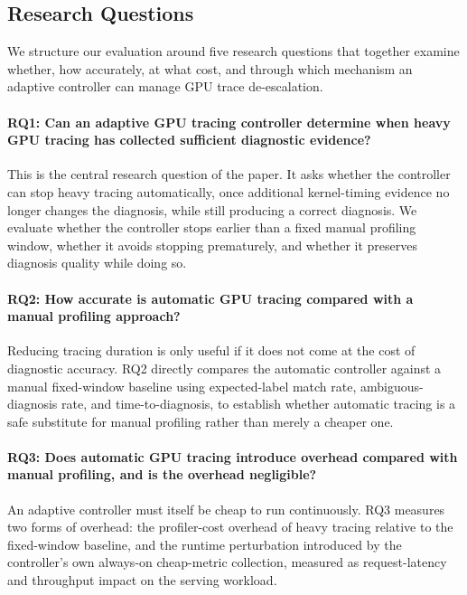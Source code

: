 \subsection{Research Questions}

We structure our evaluation around five research questions that together examine whether,
how accurately, at what cost, and through which mechanism an adaptive controller can manage
GPU trace de-escalation.

\paragraph{RQ1: Can an adaptive GPU tracing controller determine when heavy GPU tracing has
collected sufficient diagnostic evidence?}
This is the central research question of the paper. It asks whether the controller can stop
heavy tracing automatically, once additional kernel-timing evidence no longer changes the
diagnosis, while still producing a correct diagnosis. We evaluate whether the controller
stops earlier than a fixed manual profiling window, whether it avoids stopping prematurely,
and whether it preserves diagnosis quality while doing so.

\paragraph{RQ2: How accurate is automatic GPU tracing compared with a manual profiling
approach?}
Reducing tracing duration is only useful if it does not come at the cost of diagnostic
accuracy. RQ2 directly compares the automatic controller against a manual fixed-window
baseline using expected-label match rate, ambiguous-diagnosis rate, and time-to-diagnosis,
to establish whether automatic tracing is a safe substitute for manual profiling rather than
merely a cheaper one.

\paragraph{RQ3: Does automatic GPU tracing introduce overhead compared with manual profiling,
and is the overhead negligible?}
An adaptive controller must itself be cheap to run continuously. RQ3 measures two forms of
overhead: the profiler-cost overhead of heavy tracing relative to the fixed-window baseline,
and the runtime perturbation introduced by the controller's own always-on cheap-metric
collection, measured as request-latency and throughput impact on the serving workload.

